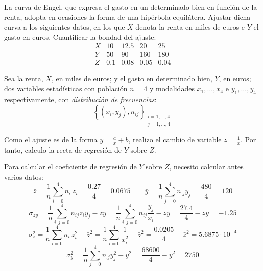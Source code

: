 \begin{ejercicio}
    La curva de Engel, que expresa el gasto en un determinado bien en función de la renta, adopta en ocasiones la forma de una hipérbola equilátera. Ajustar dicha curva a los siguientes datos, en los que $X$ denota la renta en miles de euros e $Y$ el gasto en euros. Cuantificar la bondad del ajuste:
    \begin{equation*}
        \begin{array}{c|cccc}
            X & 10 & 12.5 & 20 & 25\\ \hline
            Y & 50 & 90 & 160 & 180 \\ \hline \hline
            Z & 0.1 & 0.08 & 0.05 & 0.04
        \end{array}
    \end{equation*}

    Sea la renta, $X$, en miles de euros; y el gasto en determinado bien, $Y$, en euros; dos variables estadísticas con población $n=4$ y modalidades $x_1, \dots, x_4$ e $y_1, \dots, y_4$ respectivamente, con \emph{distribución de frecuencias}:
        $$\left\{ (x_i,y_j), n_{ij}\right\}_{\substack{i=1,\dots,4\\j=1,\dots,4}}$$

    Como el ajuste es de la forma $y=\frac{a}{x}+b$, realizo el cambio de variable $z=\frac{1}{x}$. Por tanto, calculo la recta de regresión de $Y$ sobre $Z$.

    Para calcular el coeficiente de regresión de $Y$ sobre $Z$, necesito calcular antes varios datos:
    \begin{equation*}
        \bar{z} = \frac{1}{n}\sum_{i=0}^4 n_{i.}z_i = \frac{0.27}{4} = 0.0675
        \qquad
        \bar{y} = \frac{1}{n}\sum_{j=0}^4 n_{.j}y_j = \frac{480}{4} = 120
    \end{equation*}
    \begin{equation*}
        \sigma_{zy} = \frac{1}{n} \sum_{i,j=0}^4 n_{ij}z_iy_j -\bar{z}\bar{y}
        = \frac{1}{n} \sum_{i,j=0}^4 n_{ij}\frac{y_j}{x_i} -\bar{z}\bar{y}
        =  \frac{27.4}{4} -\bar{z}\bar{y} = -1.25
    \end{equation*}
    \begin{equation*}
        \sigma_z^2 = \frac{1}{n}\sum_{i=0}^4 n_{i.}z_i^2 - \bar{z}^2
        = \frac{1}{n}\sum_{i=0}^4 \frac{1}{x_i^2} - \bar{z}^2
        = \frac{0.0205}{4} - \bar{z}^2 = 5.6875\cdot 10^{-4}
    \end{equation*}
    \begin{equation*}
        \sigma_y^2 = \frac{1}{n}\sum_{j=0}^4 n_{.j}y_j^2 - \bar{y}^2
        = \frac{68600}{4} - \bar{y}^2 = 2750
    \end{equation*}


\end{ejercicio}
